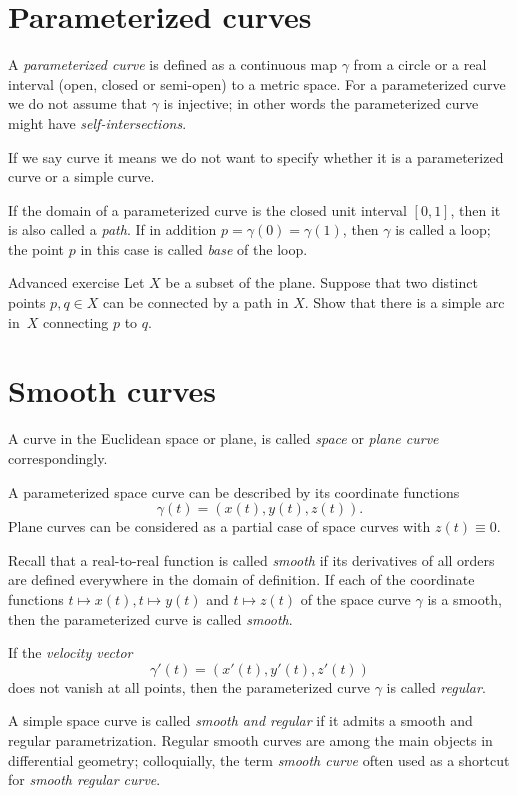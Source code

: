 \section*{Parameterized curves}

A \emph{parameterized curve} is defined as a continuous map $\gamma$ from a circle or a real interval (open, closed or semi-open) to a metric space. 
For a parameterized curve we do not assume that $\gamma$ is injective; in other words the parameterized curve might have \emph{self-intersections}.

If we say curve it means we do not want to specify whether it is a parameterized curve or a simple curve.

If the domain of a parameterized curve is the closed unit interval $[0,1]$, then it is also called a \emph{path}.
If in addition $p=\gamma(0)=\gamma(1)$, then $\gamma$ is called a loop;
the point $p$ in this case is called \emph{base} of the loop.

\begin{thm}{Advanced exercise}
Let $X$ be a subset of the plane.
Suppose that two distinct points $p,q\in X$ can be connected by a path in $X$.
Show that there is a simple arc in~$X$ connecting $p$ to $q$.
\end{thm}

\section*{Smooth curves}

A curve in the Euclidean space or plane, is called \emph{space} or \emph{plane curve} correspondingly.

A parameterized space curve can be described by its coordinate functions 
\[\gamma(t)=(x(t),y(t),z(t)).\]
Plane curves can be considered as a partial case of space curves with $z(t)\equiv 0$.

Recall that a real-to-real function is called \emph{smooth} if its derivatives of all orders are defined everywhere in the domain of definition.  
If each of the coordinate functions $t\mapsto x(t),t\mapsto y(t)$ and $t\mapsto z(t)$ of the space curve $\gamma$ is a smooth, then the parameterized curve is called \emph{smooth}.

If the \emph{velocity vector} 
\[\gamma'(t)=(x'(t),y'(t),z'(t))\] 
does not vanish at all points, then the parameterized curve $\gamma$ is called \emph{regular}.

A simple space curve is called \emph{smooth and regular} if it admits a smooth and regular parametrization.
Regular smooth curves are among the main objects in differential geometry;
colloquially, the term \emph{smooth curve} often used as a shortcut for \emph{smooth regular curve}. 


